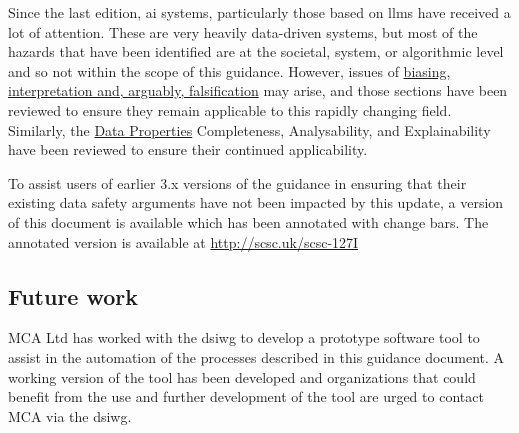 Since the last edition, \Gls{ai} systems, particularly those based on
\Glspl{llm} have received a
lot of attention.
These are very heavily data-driven systems, but most of the hazards that have been identified are
at the societal, system, or algorithmic level and so not within the scope of this guidance.
However, issues of  \hyperref[tab:issues]{biasing, interpretation and, arguably, falsification}
may arise, and those sections have been reviewed to ensure they remain applicable to this rapidly
changing field.
Similarly, the \hyperref[bkm:guidance:dataproperties]{Data Properties}
Completeness, Analysability,
and Explainability have been reviewed to ensure their continued
applicability.

To assist users of earlier 3.x versions of the guidance in ensuring that their existing data safety arguments have not been impacted by this update, a version of this document is available which has been annotated with change bars. The annotated version is available at \href{http://scsc.uk/scsc-127I}{http://scsc.uk/scsc-127I}


\subsection*{Future work}

MCA Ltd has worked with the \gls{dsiwg} to develop a prototype software tool to assist in the automation of the processes described in this guidance document.
A working version of the tool has been developed and organizations that could benefit from the use and further development of the tool are urged to contact MCA via the \gls{dsiwg}.

